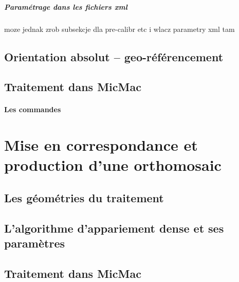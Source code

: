 \documentclass[11pt,a4paper,oneside]{book}
\begin{document}
\paragraph{Paramétrage dans les fichiers xml}
moze jednak zrob subsekcje dla pre-calibr etc i wlacz parametry xml tam
%
\section{Orientation absolut -- geo-référencement}

\section{Traitement dans MicMac}



\subsubsection{Les commandes}

\chapter{Mise en correspondance et production d'une orthomosaic}

\section{Les géométries du traitement}
\section{L’algorithme d'appariement dense et ses paramètres}
\section{Traitement dans MicMac}
\end{document}
